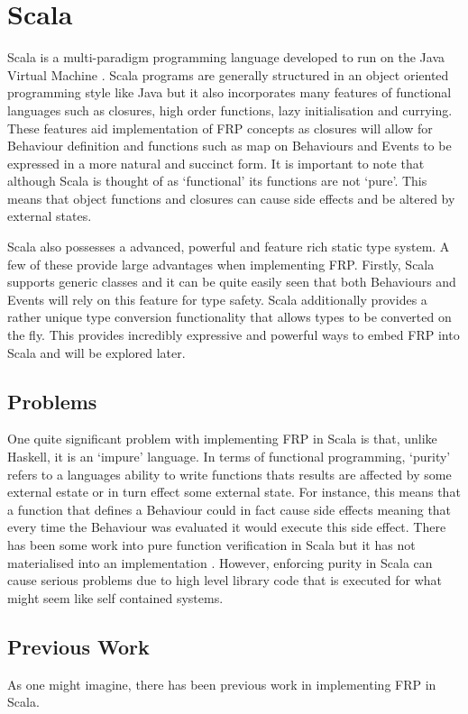 \chapter{Scala}
  Scala is a multi-paradigm programming language developed to run on the Java Virtual Machine \cite{Odersky2004}. Scala 
  programs are
  generally structured in an object oriented programming style like Java but it also incorporates many features of
  functional languages such as closures, high order functions, lazy initialisation and currying. These features aid
  implementation of FRP concepts as closures will allow for Behaviour definition and functions such as map on
  Behaviours and Events to be expressed in a more natural and succinct form. It is
  important to note that although Scala is thought of as `functional' its functions are not `pure'. This means
  that object functions and closures can cause side effects and be altered by external states.

  Scala also possesses a advanced, powerful and feature rich static type system. A few of these provide large
  advantages when implementing FRP. Firstly, Scala supports generic classes and it can be quite easily seen
  that both Behaviours and Events will rely on this feature for type safety. Scala additionally provides
  a rather unique type conversion functionality that allows types to be converted on the fly. This provides
  incredibly expressive and powerful ways to embed FRP into Scala and will be explored later.
  
  \section{Problems}
    One quite significant problem with implementing FRP in Scala is that, unlike Haskell, it is an `impure'
    language. In terms of functional programming, `purity' refers to a languages ability to write functions
    thats results are affected by some external estate or in turn effect some external state. For instance,
    this means that a function that defines a Behaviour could in fact cause side effects meaning that
    every time the Behaviour was evaluated it would execute this side effect. There has been some work into
    pure function verification in Scala but it has not materialised into an implementation \cite{Nordenberg}. 
    However, enforcing purity in Scala can cause serious problems due to high level library code that is 
    executed for what might seem like self contained systems.
  
  \section{Previous Work}
    As one might imagine, there has been previous work in implementing FRP in Scala. 
    
